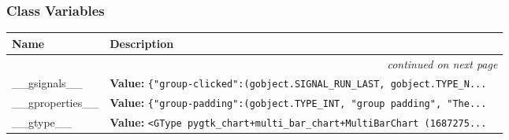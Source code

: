 
  \subsubsection{Class Variables}

    \vspace{-1cm}
\hspace{\varindent}\begin{longtable}{|p{\varnamewidth}|p{\vardescrwidth}|l}
\cline{1-2}
\cline{1-2} \centering \textbf{Name} & \centering \textbf{Description}& \\
\cline{1-2}
\endhead\cline{1-2}\multicolumn{3}{r}{\small\textit{continued on next page}}\\\endfoot\cline{1-2}
\endlastfoot\raggedright \_\-\_\-g\-s\-i\-g\-n\-a\-l\-s\-\_\-\_\- & \raggedright \textbf{Value:} 
{\tt \{"group-clicked":(gobject.SIGNAL\_RUN\_LAST, gobject.TYPE\_N\texttt{...}}&\\
\cline{1-2}
\raggedright \_\-\_\-g\-p\-r\-o\-p\-e\-r\-t\-i\-e\-s\-\_\-\_\- & \raggedright \textbf{Value:} 
{\tt \{"group-padding":(gobject.TYPE\_INT, "group padding", "The\texttt{...}}&\\
\cline{1-2}
\raggedright \_\-\_\-g\-t\-y\-p\-e\-\_\-\_\- & \raggedright \textbf{Value:} 
{\tt {\textless}GType pygtk\_chart+multi\_bar\_chart+MultiBarChart (1687275\texttt{...}}&\\
\cline{1-2}
\end{longtable}

